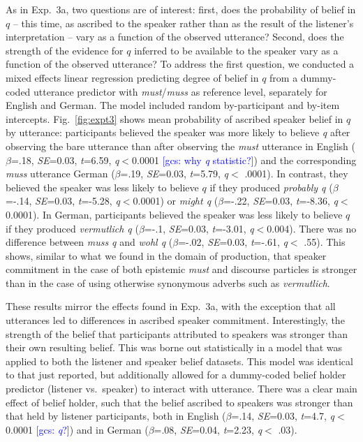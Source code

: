 \documentclass[11pt]{article}
\newcommand{\gcs}[1]{\textcolor{blue}{[gcs: #1]}}
\begin{document}
As in Exp.~3a, two questions are of interest: first, does the probability of  belief in $q$ -- this time, as ascribed to the speaker rather than as the result of the listener's interpretation --  vary as a function of the observed utterance? Second, does the strength of the evidence for $q$ inferred to be available to the speaker vary as a function of the observed utterance? To address the first question, we conducted a mixed effects linear regression predicting degree of belief in $q$ from a dummy-coded utterance predictor with \emph{must}/\emph{muss} as reference level, separately for English and German. The model included random by-participant and by-item intercepts. Fig.~\ref{fig:expt3} shows mean probability of ascribed speaker belief in $q$ by utterance: participants believed the speaker was more likely to believe \emph{q}  after observing the bare utterance than after observing the \emph{must} utterance in English   ($\beta$=.18, \emph{SE}=0.03, \emph{t}=6.59, \emph{q}$<$0.0001 \gcs{why \emph{q} statistic?}) and the corresponding \emph{muss} utterance German ($\beta$=.19, \emph{SE}=0.03, \emph{t}=5.79, \emph{q}$<$ .0001). In contrast, they believed the speaker was less likely to believe $q$ if they produced \emph{probably q} ($\beta$=-.14, \emph{SE}=0.03, \emph{t}=-5.28, \emph{q}$<$0.0001) or \emph{might q} ($\beta$=-.22, \emph{SE}=0.03, \emph{t}=-8.36, \emph{q}$<$0.0001). In German, participants believed the speaker was less likely to believe $q$ if they produced \emph{vermutlich q} ($\beta$=-.1, \emph{SE}=0.03, \emph{t}=-3.01, \emph{q}$<$0.004). There was no difference between \emph{muss q} and \emph{wohl q} ($\beta$=-.02, \emph{SE}=0.03, \emph{t}=-.61, \emph{q}$<$ .55).  This shows, similar to what we found in the domain of production, that speaker commitment in the case of both epistemic \emph{must} and discourse particles is stronger than in the case of using otherwise synonymous adverbs such as \emph{vermutlich}.

These results mirror the effects found in Exp.~3a, with the exception that all utterances led to differences in ascribed speaker commitment. Interestingly, the strength of the belief that participants attributed to speakers was stronger than their own resulting belief. This was borne out statistically in a model that was applied to both the listener and speaker belief datasets. This model was identical to that just reported, but additionally allowed for a dummy-coded belief holder predictor (listener vs.~speaker)  to interact with utterance. There was a clear main effect of belief holder, such that the belief ascribed to speakers was stronger than that held by listener participants, both in English ($\beta$=.14, \emph{SE}=0.03, \emph{t}=4.7, \emph{q}$<$0.0001 \gcs{\emph{q}?}) and in German ($\beta$=.08, \emph{SE}=0.04, \emph{t}=2.23, \emph{q}$<$ .03). 
\end{document}
